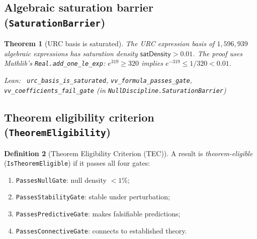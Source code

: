 \documentclass[11pt,a4paper]{article}
\newenvironment{leanref}%
  {\par\smallskip\noindent\begingroup\raggedright\textup{Lean:}~}%
  {\par\endgroup}
\newtheorem{theorem}{Theorem}[section]
\theoremstyle{definition}
\newtheorem{definition}[theorem]{Definition}
\begin{document}
\subsection{Algebraic saturation barrier (\texttt{SaturationBarrier})}\label{subsec:saturation}

\begin{theorem}[URC basis is saturated]\label{thm:urc-saturated}
The URC expression basis of $1{,}596{,}939$ algebraic expressions has
saturation density $\mathsf{satDensity} > 0.01$.  The proof uses
Mathlib's \lstinline|Real.add_one_le_exp|: $e^{319} \ge 320$ implies
$e^{-319} \le 1/320 < 0.01$.

\begin{leanref} \lstinline|urc_basis_is_saturated|,
\lstinline|vv_formula_passes_gate|,
\lstinline|vv_coefficients_fail_gate|
\textup{(in \texttt{NullDiscipline.SaturationBarrier})}
\end{leanref}
\end{theorem}

\subsection{Theorem eligibility criterion (\texttt{TheoremEligibility})}\label{subsec:tec}

\begin{definition}[Theorem Eligibility Criterion (TEC)]
A result is \emph{theorem-eligible} (\lstinline|IsTheoremEligible|) if it passes all four gates:
\begin{enumerate}[nosep,label=(\arabic*)]
\item \texttt{PassesNullGate}: null density $< 1\%$;
\item \texttt{PassesStabilityGate}: stable under perturbation;
\item \texttt{PassesPredictiveGate}: makes falsifiable predictions;
\item \texttt{PassesConnectiveGate}: connects to established theory.
\end{enumerate}
\end{definition}
\end{document}
